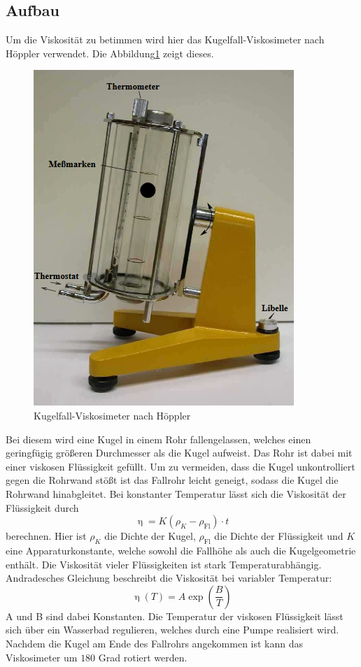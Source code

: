 \subsection{Aufbau}
Um die Viskosität zu betimmen wird hier das Kugelfall-Viskosimeter nach Höppler verwendet.
Die Abbildung\ref{fig:aufbau} zeigt dieses.
\begin{figure}[H]
  \centering
  \includegraphics{content/Aufbau.png}
  \caption{Kugelfall-Viskosimeter nach Höppler\cite{v107}}
  \label{fig:aufbau}
\end{figure}
Bei diesem wird eine Kugel in einem Rohr fallengelassen, welches einen geringfügig größeren Durchmesser als die Kugel aufweist.
Das Rohr ist dabei mit einer viskosen Flüssigkeit gefüllt.
Um zu vermeiden, dass die Kugel unkontrolliert gegen die Rohrwand stößt ist das Fallrohr leicht geneigt, sodass die Kugel die Rohrwand hinabgleitet.
Bei konstanter Temperatur lässt sich die Viskosität der Flüssigkeit durch
\begin{equation}
  \upeta = K (\rho_K -\rho_\text{Fl}) \cdot t
\end{equation}
 berechnen.
Hier ist $\rho_K$ die Dichte der Kugel, $\rho_\text{Fl}$ die Dichte der Flüssigkeit und $K$ eine Apparaturkonstante, welche sowohl die Fallhöhe als auch die Kugelgeometrie enthält.
Die Viskosität vieler Flüssigkeiten ist stark Temperaturabhängig.
Andradesches Gleichung beschreibt die Viskosität bei variabler Temperatur:
\begin{equation}
  \label{eq:and}
  \upeta (T)= A \exp(\frac{B}{T})
\end{equation}
A und B sind dabei Konstanten.
Die Temperatur der viskosen Flüssigkeit lässt sich über ein Wasserbad regulieren, welches durch eine Pumpe realisiert wird.
Nachdem die Kugel am Ende des Fallrohrs angekommen ist kann das Viskosimeter um $180$ Grad rotiert werden.
